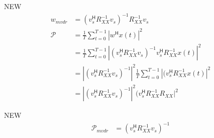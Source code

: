 \documentclass{article}
\begin{document}
NEW
\begin{align*}
	w_{mvdr} &= (v_s^\mathsf{H} R_{XX}^{-1} v_s)^{-1} R_{XX}^{-1} v_s 
	\\
	\mathcal{P} &= \frac{1}{T} \sum_{t=0}^{T-1} | w^\mathsf{H} x(t) | ^2
	\\
	&= \frac{1}{T} \sum_{t=0}^{T-1} | (v_s^\mathsf{H} R_{XX}^{-1} v_s)^{-1} v_s ^\mathsf{H} R_{XX}^{-1}  x(t) | ^2
	\\
	&= \left| (v_s^\mathsf{H} R_{XX}^{-1} v_s)^{-1} \right| ^ 2 \frac{1}{T} \sum_{t=0}^{T-1} | ( v_s ^\mathsf{H} R_{XX}^{-1}  x(t) | ^2
	\\
	&= \left| (v_s^\mathsf{H} R_{XX}^{-1} v_s)^{-1} \right| ^ 2 ( v_s ^\mathsf{H} R_{XX}^{-1} R_{XX} | ^2
\end{align*}

NEW
\begin{align*}
	\mathcal{P}_{mvdr} &= (v_s^\mathsf{H} R_{XX}^{-1} v_s)^{-1} 
\end{align*}
\end{document}
